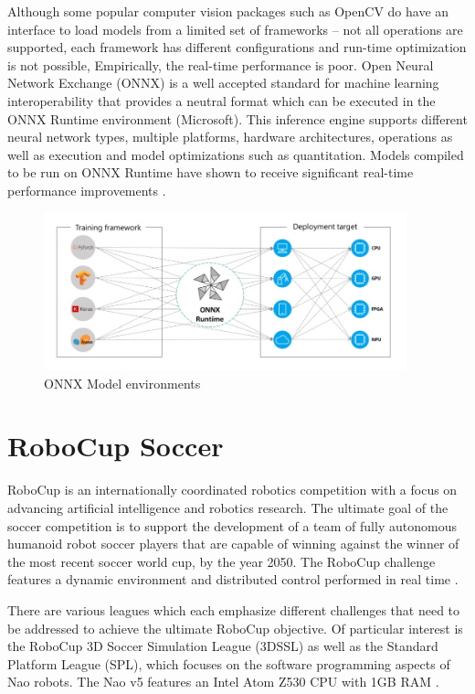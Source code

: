 \documentclass[a4paper,twoside,12pt]{report}
\begin{document}
Although some popular computer vision packages such as OpenCV do have an interface to load models from a limited set of frameworks -- not all operations are supported, each framework has different configurations and run-time optimization is not possible, Empirically, the real-time performance is poor. Open Neural Network Exchange (ONNX) is a well accepted standard \citep{onnx} for machine learning interoperability that provides a neutral format which can be executed in the ONNX Runtime environment (Microsoft). This inference engine supports different neural network types, multiple platforms, hardware architectures, operations as well as execution and model optimizations such as quantitation. Models compiled to be run on ONNX Runtime have shown to receive significant real-time performance improvements \citep{inference}.

\begin{figure}[h!]
\begin{center}
\includegraphics[width=10.5cm]{images/onnx.jpg}
\caption{ONNX Model environments \citep{onnx}}
\label{fig:onnxplot}
\end{center}
\end{figure}

\newpage
\section{RoboCup Soccer}
RoboCup is an internationally coordinated robotics competition with a focus on advancing artificial intelligence and robotics research. The ultimate goal of the soccer competition is to support the development of a team of fully autonomous humanoid robot soccer players that are capable of winning against the winner of the most recent soccer world cup, by the year 2050. The RoboCup challenge features a dynamic environment and distributed control performed in real time \citep{RoboCupObj}.\

There are various leagues which each emphasize different challenges that need to be addressed to achieve the ultimate RoboCup objective. Of particular interest is the RoboCup 3D Soccer Simulation League (3DSSL) as well as the Standard Platform League (SPL), which focuses on the software programming aspects of Nao robots. The Nao v5 features an Intel Atom Z530 CPU with 1GB RAM \citep{naov5}.
\end{document}
